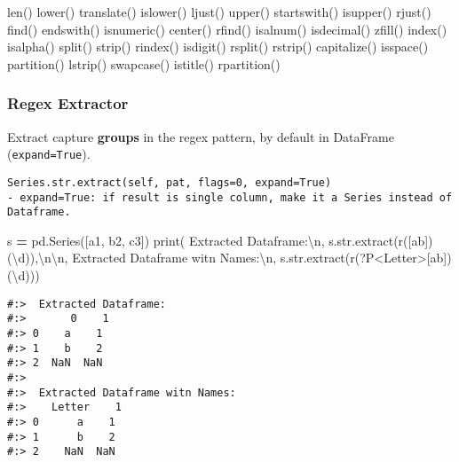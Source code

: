 \documentclass[
]{book}
\newenvironment{Shaded}{\begin{snugshade}}{\end{snugshade}}
\newcommand{\BuiltInTok}[1]{#1}
\newcommand{\CharTok}[1]{\textcolor[rgb]{0.5,0.5,0.5}{#1}}
\newcommand{\NormalTok}[1]{#1}
\newcommand{\OperatorTok}[1]{\textcolor[rgb]{0.43,0.43,0.43}{\textbf{#1}}}
\newcommand{\StringTok}[1]{\textcolor[rgb]{0.5,0.5,0.5}{#1}}
\newcommand{\VerbatimStringTok}[1]{\textcolor[rgb]{0.5,0.5,0.5}{#1}}
\begin{document}
len() lower() translate() islower() ljust() upper() startswith() isupper() rjust() find() endswith() isnumeric() center() rfind() isalnum() isdecimal() zfill() index() isalpha() split() strip() rindex() isdigit() rsplit() rstrip() capitalize() isspace() partition() lstrip() swapcase() istitle() rpartition()

\hypertarget{regex-extractor}{%
\subsubsection{Regex Extractor}\label{regex-extractor}}

Extract capture \textbf{groups} in the regex pattern, by default in DataFrame (\texttt{expand=True}).

\begin{verbatim}
Series.str.extract(self, pat, flags=0, expand=True)
- expand=True: if result is single column, make it a Series instead of Dataframe.
\end{verbatim}

\begin{Shaded}
\begin{Highlighting}[]
\NormalTok{s }\OperatorTok{=}\NormalTok{ pd.Series([}\StringTok{\textquotesingle{}a1\textquotesingle{}}\NormalTok{, }\StringTok{\textquotesingle{}b2\textquotesingle{}}\NormalTok{, }\StringTok{\textquotesingle{}c3\textquotesingle{}}\NormalTok{])}
\BuiltInTok{print}\NormalTok{( }
  \StringTok{\textquotesingle{} Extracted Dataframe:}\CharTok{\textbackslash{}n}\StringTok{\textquotesingle{}}\NormalTok{, s.}\BuiltInTok{str}\NormalTok{.extract(}\VerbatimStringTok{r\textquotesingle{}([ab])(\textbackslash{}d)\textquotesingle{}}\NormalTok{),}\StringTok{\textquotesingle{}}\CharTok{\textbackslash{}n\textbackslash{}n}\StringTok{\textquotesingle{}}\NormalTok{,}
  \StringTok{\textquotesingle{}Extracted Dataframe witn Names:}\CharTok{\textbackslash{}n}\StringTok{\textquotesingle{}}\NormalTok{, s.}\BuiltInTok{str}\NormalTok{.extract(}\VerbatimStringTok{r\textquotesingle{}(?P\textless{}Letter\textgreater{}[ab])(\textbackslash{}d)\textquotesingle{}}\NormalTok{))}
\end{Highlighting}
\end{Shaded}

\begin{verbatim}
#:>  Extracted Dataframe:
#:>       0    1
#:> 0    a    1
#:> 1    b    2
#:> 2  NaN  NaN 
#:> 
#:>  Extracted Dataframe witn Names:
#:>    Letter    1
#:> 0      a    1
#:> 1      b    2
#:> 2    NaN  NaN
\end{verbatim}
\end{document}
